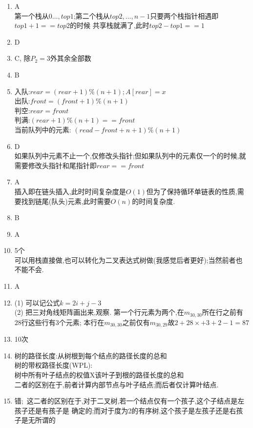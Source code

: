 \documentclass[12pt, a4paper, oneside, UTF8]{ctexbook}
\begin{document}
\begin{enumerate}
    \item A \\
    第一个栈从$0\ldots,top1$;第二个栈从$top2,\ldots,n-1$只要两个栈指针相遇即$top1+1==top2$的时候
    共享栈就满了,此时$top2-top1==1$ 

    \item D 

    \item C, 除$P_2=3$外其余全部数 
    \item B
    \item   
    入队:$rear=(rear+1)\% (n+1); A[rear]=x$ \\
    出队:$front=(front+1)\%(n+1)$ \\
    判空:$rear=front$ \\
    判满:$(rear+1)\%(n+1)==front$\\
    当前队列中的元素: $(read-front+n+1)\%(n+1)$
    \item D \\
    如果队列中元素不止一个,仅修改头指针;但如果队列中的元素仅一个的时候,就需要修改头指针和尾指针即$rear==front$
    \item A \\ 
    插入即在链头插入,此时时间复杂度是$O(1)$但为了保持循环单链表的性质,需要找到链尾(队头)元素,此时需要$O(n)$的时间复杂度.
    \item B 
    \item A
    \item 5个 \\
    可以用栈直接做,也可以转化为二叉表达式树做(我感觉后者更好);当然前者也不能不会.
    \item A
    \item 
    (1) 可以记公式$k=2i+j-3$ \\
    (2) 把三对角线矩阵画出来,观察. 第一个行元素为两个,在$m_{30,30}$所在行之前有$28$行这些行有3个元素;
    本行在$m_{30,30}$之前仅有$m_{30,29}$故$2+28\times+3+2 - 1 = 87$
    \item 10次
    \item 
    树的路径长度:从树根到每个结点的路径长度的总和 \\
    树的带权路径长度(WPL):\\
    树中所有叶子结点的权值X该叶子到根的路径长度的总和 \\
    二者的区别在于,前者计算内部节点与叶子结点;而后者仅计算叶结点.
    \item 
    错;\ 这二者的区别在于,对于二叉树,若一个结点仅有一个孩子,这个子结点是左孩子还是有孩子是
    确定的;而对于度为2的有序树,这个孩子是左孩子还是右孩子是无所谓的 \\

\end{enumerate}
\end{document}
